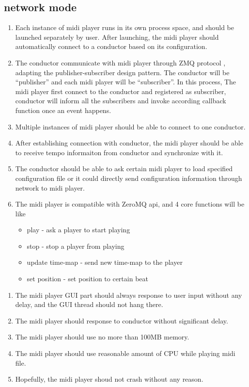\subsection{network mode}
\begin{enumerate}
  \item Each instance of midi player runs in its own process space, and should be launched separately by user.
        After launching, the midi player should automatically connect to a conductor 
        based on its configuration.
  \item The conductor communicate with midi player through ZMQ protocol \cite{ZMQ}, adapting the publisher-subscriber 
        design pattern. The conductor will be ``publisher'' and each midi player will be ``subscriber''. In this process, 
        The midi player first connect to the conductor and registered as subscriber, conductor will inform all the 
        subscribers and invoke according callback function once an event happens.
  \item Multiple instances of midi player should be able to connect to one conductor. 
  \item After establishing connection with conductor, the midi player should be able to receive tempo informaiton 
        from conductor and synchronize with it.     
  \item The conductor should be able to ask certain midi player to load specified configuration file or it could directly 
        send configuration information through network to midi player.
  \item 
    The midi player is compatible with ZeroMQ \cite{zeromq} api, and 4 core functions will be like
    \begin{itemize}
      \item play - ask a player to start playing 
      \item stop - stop a player from playing 
      \item update time-map - send new time-map to the player 
      \item set position - set position to certain beat 
    \end{itemize}
\end{enumerate}

\begin{enumerate}
  \item The midi player GUI part should always response to user input without any delay, and the GUI thread 
        should not hang there.
  \item The midi player should response to conductor without significant delay.
  \item The midi player should use no more than 100MB memory.
  \item The midi player should use reasonable amount of CPU while playing midi file.
  \item Hopefully, the midi player shoud not crash without any reason. 
\end{enumerate}
